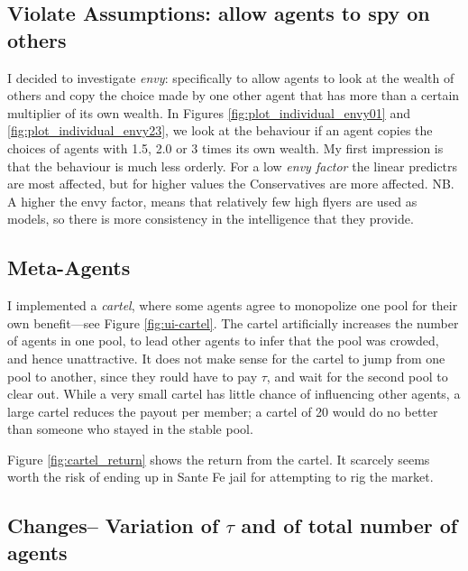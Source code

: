 \documentclass[]{article}
\begin{document}
\subsection{\texorpdfstring{Violate Assumptions: allow agents to spy on
others\label{heading:violate-sssumptions}}{Violate Assumptions: allow agents to spy on others}}\label{violate-assumptions-allow-agents-to-spy-on-others}

I decided to investigate \emph{envy}: specifically to allow agents to
look at the wealth of others and copy the choice made by one other agent
that has more than a certain multiplier of its own wealth. In Figures
\ref{fig:plot_individual_envy01} and \ref{fig:plot_individual_envy23},
we look at the behaviour if an agent copies the choices of agents with
1.5, 2.0 or 3 times its own wealth. My first impression is that the
behaviour is much less orderly. For a low \emph{envy factor} the linear
predictrs are most affected, but for higher values the Conservatives are
more affected. NB. A higher the envy factor, means that relatively few
high flyers are used as models, so there is more consistency in the
intelligence that they provide.

\subsection{\texorpdfstring{Meta-Agents\label{heading:meta-agents}}{Meta-Agents}}\label{meta-agents}

I implemented a \emph{cartel}, where some agents agree to monopolize one
pool for their own benefit---see Figure \ref{fig:ui-cartel}. The cartel
artificially increases the number of agents in one pool, to lead other
agents to infer that the pool was crowded, and hence unattractive. It
does not make sense for the cartel to jump from one pool to another,
since they rould have to pay \(\tau\), and wait for the second pool to
clear out. While a very small cartel has little chance of influencing
other agents, a large cartel reduces the payout per member; a cartel of
20 would do no better than someone who stayed in the stable pool.

Figure \ref{fig:cartel_return} shows the return from the cartel. It
scarcely seems worth the risk of ending up in Sante Fe jail for
attempting to rig the market.

\subsection{\texorpdfstring{Changes-- Variation of \(\tau\) and of total
number of
agents}{Changes-- Variation of \textbackslash{}tau and of total number of agents}}\label{changes-variation-of-tau-and-of-total-number-of-agents}
\end{document}
